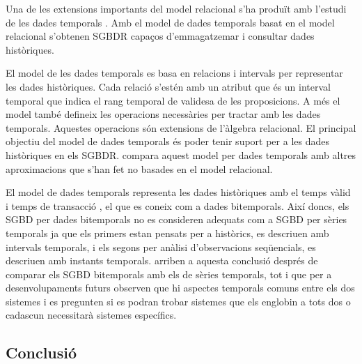 
Una de les extensions importants del model relacional s'ha produït amb
l'estudi de les dades
temporals \parencite{date02:_tempor_data_relat_model}. Amb el model de
dades temporals basat en el model relacional s'obtenen SGBDR capaços
d'emmagatzemar i consultar dades històriques.

El model de les dades
temporals \parencite{date02:_tempor_data_relat_model} es basa en
relacions i intervals per representar les dades històriques. Cada
relació s'estén amb un atribut que és un interval temporal que indica
el rang temporal de validesa de les proposicions. A més el model també
defineix les operacions necessàries per tractar amb les dades
temporals. Aquestes operacions són extensions de l'àlgebra relacional.
El principal objectiu del model de dades temporals és poder tenir
suport per a les dades històriques en els SGBDR.
\textcite[cap.~28]{date06} compara aquest model per dades temporals
amb altres aproximacions que s'han fet no basades en el model
relacional.



El model de dades temporals representa les dades històriques amb el
temps vàlid i temps de
transacció \parencite[cap.~15]{date02:_tempor_data_relat_model}, el
que es coneix com a dades bitemporals.  Així doncs, els SGBD per dades
bitemporals no es consideren adequats com a SGBD per sèries temporals
ja que els primers estan pensats per a històrics, es descriuen amb
intervals temporals, i els segons per anàlisi d'observacions
seqüencials, es descriuen amb instants temporals.
\textcite{schmidt95} arriben a aquesta conclusió després de comparar
els SGBD bitemporals amb els de sèries temporals, tot i que per a
desenvolupaments futurs observen que hi aspectes temporals comuns
entre els dos sistemes i es pregunten si es podran trobar sistemes que
els englobin a tots dos o cadascun necessitarà sistemes específics.





\subsection{Conclusió}


